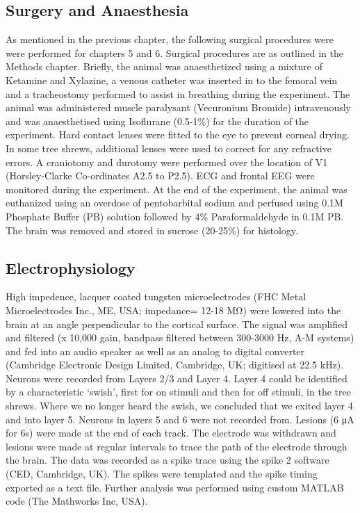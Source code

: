 	\subsection{Surgery and Anaesthesia}
	
	As mentioned in the previous chapter, the following surgical procedures were were performed for chapters 5 and 6. Surgical procedures are as outlined in the Methods chapter. Briefly, the animal was anaesthetized using a mixture of Ketamine and Xylazine, a venous catheter was inserted in to the femoral vein and a tracheostomy performed to assist in breathing during the experiment. The animal was administered muscle paralysant (Vecuronium Bromide) intravenously and was anaesthetised using Isoflurane (0.5-1\%) for the duration of the experiment. Hard contact lenses were fitted to the eye to prevent corneal drying. In some tree shrews, additional lenses were used to correct for any refractive errors. A craniotomy and durotomy were performed over the location of V1 (Horsley-Clarke Co-ordinates A2.5 to P2.5). ECG and frontal EEG were monitored during the experiment. At the end of the experiment, the animal was euthanized using an overdose of pentobarbital sodium and perfused using 0.1M Phosphate Buffer (PB) solution followed by 4\% Paraformaldehyde in 0.1M PB. The brain was removed and stored in sucrose (20-25\%) for histology.	
	
		\subsection{Electrophysiology}
		High impedence, lacquer coated tungsten microelectrodes (FHC Metal Microelectrodes Inc., ME, USA; impedance= 12-18 MΩ) were lowered into the brain at an angle perpendicular to the cortical surface. The signal was amplified and filtered (x 10,000 gain, bandpass filtered between 300-3000 Hz, A-M systems) and fed into an audio speaker as well as an analog to digital converter (Cambridge Electronic Design Limited, Cambridge, UK; digitised at 22.5 kHz). Neurons were recorded from Layers 2/3 and Layer 4. Layer 4 could be identified by a characteristic ‘swish’, first for on stimuli and then for off stimuli, in the tree shrews. Where we no longer heard the swish, we concluded that we exited layer 4 and into layer 5. Neurons in layers 5 and 6 were not recorded from. Lesions (6 μA for 6s) were made at the end of each track. The electrode was withdrawn and lesions were made at regular intervals to trace the path of the electrode through the brain. The data was recorded as a spike trace using the spike 2 software (CED, Cambridge, UK). The spikes were templated and the spike timing exported as a text file. Further analysis was performed using custom MATLAB code (The Mathworks Inc, USA).
